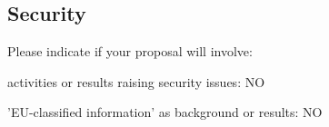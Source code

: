 \documentclass[noworkareas,deliverables,\classoptions]{euproposal}       %
\begin{document}
\begin{proposal}
\subsection{Security}

Please indicate if your proposal will involve:

\begin{compactitem}
\item activities or results raising security issues: NO
\item 'EU-classified information' as background or results: NO
\end{compactitem}
\end{proposal}
\end{document}
